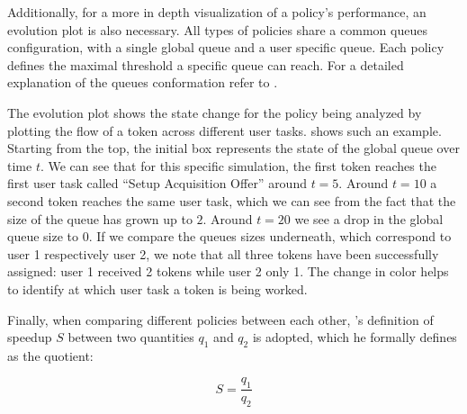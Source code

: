 Additionally, for a more in depth visualization of a policy's performance, an evolution plot is also necessary. All types of policies share a common queues configuration, with a single global queue and a user specific queue. Each policy defines the maximal threshold a specific queue can reach. For a detailed explanation of the queues conformation refer to .

The evolution plot shows the state change for the policy being analyzed by plotting the flow of a token across different user tasks.  shows such an example. Starting from the top, the initial box represents the state of the global queue over time $t$. We can see that for this specific simulation, the first token reaches the first user task called ``Setup Acquisition Offer'' around $t=5$. Around $t=10$ a second token reaches the same user task, which we can see from the fact that the size of the queue has grown up to $2$. Around $t=20$ we see a drop in the global queue size to $0$. If we compare the queues sizes underneath, which correspond to user 1 respectively user 2, we note that all three tokens have been successfully assigned: user 1 received 2 tokens while user 2 only 1. The change in color helps to identify at which user task a token is being worked.


Finally, when comparing different policies between each other, \citet{Milo2012}'s definition of speedup $S$ between two quantities $q_1$ and $q_2$ is adopted, which he formally defines as the quotient: 

\begin{equation}
	S=\frac{q_1}{q_2}
\end{equation}
